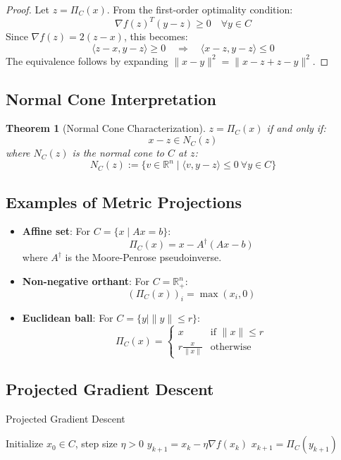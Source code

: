 \documentclass{article}
\newtheorem{theorem}{Theorem}
\begin{document}
\begin{proof}
Let \( z = \Pi_C(x) \). From the first-order optimality condition:
\[
\nabla f(z)^T (y - z) \geq 0 \quad \forall y \in C
\]
Since \( \nabla f(z) = 2(z - x) \), this becomes:
\[
\langle z - x, y - z \rangle \geq 0 \quad \Rightarrow \quad \langle x - z, y - z \rangle \leq 0
\]
The equivalence follows by expanding \( \|x - y\|^2 = \|x - z + z - y\|^2 \).
\end{proof}

\subsection{Normal Cone Interpretation}
\begin{theorem}[Normal Cone Characterization]
\( z = \Pi_C(x) \) if and only if:
\[
x - z \in N_C(z)
\]
where \( N_C(z) \) is the normal cone to \( C \) at \( z \):
\[
N_C(z) := \{ v \in \mathbb{R}^n \mid \langle v, y - z \rangle \leq 0 \ \forall y \in C \}
\]
\end{theorem}

\subsection{Examples of Metric Projections}
\begin{property}
\begin{itemize}
\item \textbf{Affine set}: For \( C = \{x \mid Ax = b\} \):
\[
\Pi_C(x) = x - A^\dagger(Ax - b)
\]
where \( A^\dagger \) is the Moore-Penrose pseudoinverse.

\item \textbf{Non-negative orthant}: For \( C = \mathbb{R}^n_+ \):
\[
(\Pi_C(x))_i = \max(x_i, 0)
\]

\item \textbf{Euclidean ball}: For \( C = \{y \mid \|y\| \leq r\} \):
\[
\Pi_C(x) = \begin{cases}
x & \text{if } \|x\| \leq r \\
r \frac{x}{\|x\|} & \text{otherwise}
\end{cases}
\]
\end{itemize}
\end{property}

\subsection{Projected Gradient Descent}
\begin{algorithm}[H]
\caption{Projected Gradient Descent}
\begin{algorithmic}[1]
\State Initialize \( x_0 \in C \), step size \( \eta > 0 \)
\State \( y_{k+1} = x_k - \eta \nabla f(x_k) \)
\State \( x_{k+1} = \Pi_C(y_{k+1}) \)
\EndFor
\end{algorithmic}
\end{algorithm}
\end{document}
